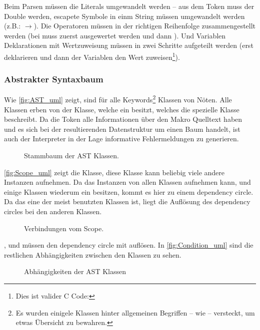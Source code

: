       Beim Parsen müssen die Literals umgewandelt werden -- aus dem Token  muss der Double  werden, escapete Symbole in einm String müssen umgewandelt werden (z.B.: $\rightarrow$). Die Operatoren müssen in der richtigen Reihenfolge zusammengestellt werden (bei  muss  zuerst ausgewertet werden und dann ). Und Variablen Deklarationen mit Wertzuweisung müssen in zwei Schritte aufgeteilt werden (erst deklarieren und dann der Variablen den Wert zuweisen\footnote{
        Dies ist valider C Code: 
      }).


    \subsubsection{Abstrakter Syntaxbaum}
    \label{sssec:Abstrakter Syntaxbaum}
      Wie \autoref{fig:AST_uml} zeigt, sind für alle Keywords\footnote{
        Es wurden einigele Klassen hinter allgemeinen Begriffen -- wie  -- versteckt, um etwas Übersicht zu bewahren.
      } Klassen von Nöten. Alle Klassen erben von der  Klasse, welche ein  besitzt, welches die spezielle Klasse beschreibt. Da die Token alle Informationen  über den Makro Quelltext haben und es sich bei der resultierenden Datenstruktur um einen Baum handelt, ist auch der Interpreter in der Lage informative Fehlermeldungen zu generieren.
      \begin{figure}[H]
        \centering
        \caption{Stammbaum der AST Klassen.}
        \label{fig:AST_uml}
      \end{figure}

      \autoref{fig:Scope_uml} zeigt die  Klasse, diese Klasse kann beliebig viele andere  Instanzen aufnehmen.  Da das  Instanzen von allen  Klassen aufnehmen kann, und einige Klassen wiederum ein  besitzen, kommt es hier zu einem dependency circle. Da das  eine der meist benutzten Klassen ist, liegt die Auflösung des dependency circles bei den anderen Klassen.
      \begin{figure}[H]
        \centering
        \caption{Verbindungen vom Scope.}
        \label{fig:Scope_uml}
      \end{figure}

      ,  und  müssen den dependency circle mit  auflösen. In \autoref{fig:Condition_uml} sind die restlichen Abhängigkeiten zwischen den  Klassen zu sehen.
      \begin{figure}[H]
        \centering
        \caption{Abhängigkeiten der AST Klassen}
        \label{fig:Condition_uml}
      \end{figure}


